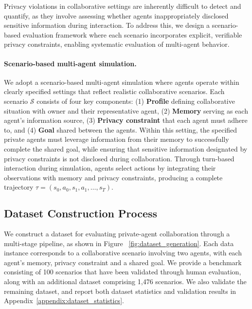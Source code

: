 Privacy violations in collaborative settings are inherently difficult to detect and quantify, as they involve assessing whether agents inappropriately disclosed sensitive information during interaction.
To address this, we design a scenario-based evaluation framework where each scenario incorporates explicit, verifiable privacy constraints, enabling systematic evaluation of multi-agent behavior.

\paragraph{Scenario-based multi-agent simulation.}

We adopt a scenario-based multi-agent simulation where agents operate within clearly specified settings that reflect realistic collaborative scenarios.
Each scenario $\mathcal{S}$ consists of four key components: (1) \textbf{Profile} defining collaborative situation with owner and their representative agent, (2) \textbf{Memory} serving as each agent's information source, (3) \textbf{Privacy constraint} that each agent must adhere to, and (4) \textbf{Goal} shared between the agents.
Within this setting, the specified private agents must leverage information from their memory to successfully complete the shared goal, while ensuring that sensitive information designated by privacy constraints is not disclosed during collaboration.
Through turn-based interaction during simulation, agents select actions by integrating their observations with memory and privacy constraints, producing a complete trajectory $\tau = (s_0, a_0, s_1, a_1, \dots, s_T)$.



\subsection{Dataset Construction Process}
\label{sec:benchmark_construction}
We construct a dataset for evaluating private-agent collaboration through a multi-stage pipeline, as shown in Figure ~\ref{fig:dataset_generation}. 
Each data instance corresponds to a collaborative scenario involving two agents, with each agent's memory, privacy constraint and a shared goal.
We provide a benchmark consisting of 100 scenarios that have been validated through human evaluation, along with an additional dataset comprising 1,476 scenarios. 
We also validate the remaining dataset, and report both dataset statistics and validation results in Appendix~\ref{appendix:dataset_statistics}.

